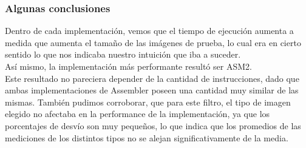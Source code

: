 \subsubsection{Algunas conclusiones}
Dentro de cada implementación, vemos que el tiempo de ejecución aumenta a medida que aumenta el tamaño de las imágenes de prueba, lo cual era en cierto sentido lo que nos indicaba nuestro intuición que iba a suceder.\\
Así mismo, la implementación más performante resultó ser ASM2.\\
Este resultado no pareciera depender de la cantidad de instrucciones, dado que ambas implementaciones de Assembler poseen una cantidad muy similar de las mismas. 
También pudimos corroborar, que para este filtro, el tipo de imagen elegido no afectaba en la performance de la implementación, ya que los porcentajes de desvío son muy pequeños, lo que indica que los promedios de las mediciones de los distintos tipos no se alejan significativamente de la media.\\


